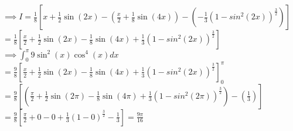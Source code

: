 \documentclass{article}
\begin{document}
{    $ \implies I 
    = \frac{1}{8}\left[
        x 
        + \frac{1}{2}\sin(2x)
        - (\frac{x}{2} + \frac{1}{8}\sin(4x))
        - (-\frac{1}{3}(1-sin^2(2x))^{\frac{3}{2}})
    \right] $\\

    $ 
    = \frac{1}{8}\left[
        \frac{x}{2}
        + \frac{1}{2}\sin(2x)
        - \frac{1}{8}\sin(4x)
        +\frac{1}{3}(1-sin^2(2x))^{\frac{3}{2}}
    \right] $\\

    $ \implies \int_{0}^{\pi}{9\sin^2(x)\cos^4(x)}dx $\\

    $
    = \frac{9}{8}\left[
        \frac{x}{2}
        + \frac{1}{2}\sin(2x)
        - \frac{1}{8}\sin(4x)
        +\frac{1}{3}(1-sin^2(2x))^{\frac{3}{2}}
    \right]_{0}^{\pi} $\\

    $
    = \frac{9}{8}\left[
        (
            \frac{\pi}{2}
            + \frac{1}{2}\sin(2\pi)
            - \frac{1}{8}\sin(4\pi)
            +\frac{1}{3}(1-sin^2(2\pi))^{\frac{3}{2}}
        )
        -
        (\frac{1}{3})
    \right] $\\

    $ = \frac{9}{8}\left[
        \frac{\pi}{2} + 0 - 0
        + \frac{1}{3}(1-0)^{\frac{3}{2}}
        - \frac{1}{3}
    \right] = \frac{9\pi}{16} $\\


}
\end{document}
